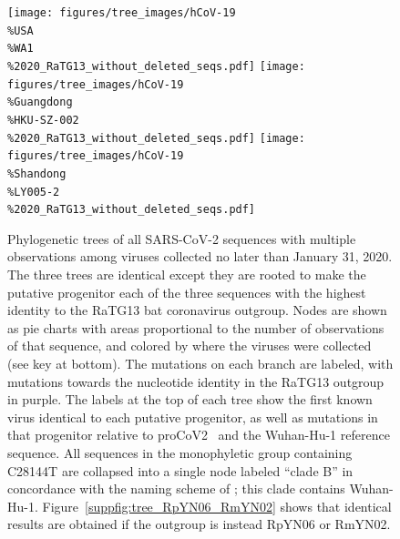 \documentclass[9pt,twocolumn,twoside]{gsajnl_modified}
\begin{document}
 \begin{figure}
 \centerline{
 \texttt{[image: figures/tree\_images/hCoV-19\\\%USA\\\%WA1\\\%2020\_RaTG13\_without\_deleted\_seqs.pdf]}
 \hspace{0.02\linewidth}
 \texttt{[image: figures/tree\_images/hCoV-19\\\%Guangdong\\\%HKU-SZ-002\\\%2020\_RaTG13\_without\_deleted\_seqs.pdf]}
  \hspace{0.02\linewidth}
 \texttt{[image: figures/tree\_images/hCoV-19\\\%Shandong\\\%LY005-2\\\%2020\_RaTG13\_without\_deleted\_seqs.pdf]}
 }
 \caption{
 Phylogenetic trees of all SARS-CoV-2 sequences with multiple observations among viruses collected no later than January 31, 2020.
 The three trees are identical except they are rooted to make the putative progenitor each of the three sequences with the highest identity to the RaTG13 bat coronavirus outgroup.
Nodes are shown as pie charts with areas proportional to the number of observations of that sequence, and colored by where the viruses were collected (see key at bottom).
The mutations on each branch are labeled, with mutations towards the nucleotide identity in the RaTG13 outgroup in purple.
The labels at the top of each tree show the first known virus identical to each putative progenitor, as well as mutations in that progenitor relative to proCoV2~\citep{kumar2021evolutionary} and the Wuhan-Hu-1 reference sequence.
All sequences in the monophyletic group containing C28144T are collapsed into a single node labeled ``clade B'' in concordance with the naming scheme of \citet{rambaut2020dynamic}; this clade contains Wuhan-Hu-1.
 Figure~\ref{suppfig:tree_RpYN06_RmYN02} shows that identical results are obtained if the outgroup is instead RpYN06 or RmYN02.
\label{fig:tree_RaTG13}
 }
 \end{figure}
\end{document}
